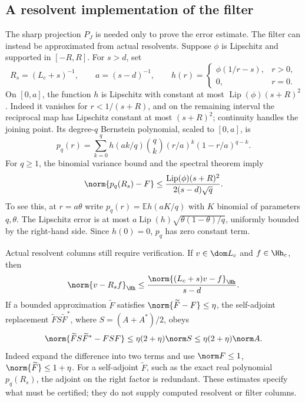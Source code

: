 \subsection{A resolvent implementation of the filter}
\label{vfourB:resolvent-filter}

The sharp projection $P_J$ is needed only to prove the error estimate.
The filter can instead be approximated from actual resolvents. Suppose
$\phi$ is Lipschitz and supported in $[-R,R]$. For $s>d$, set
\[
 R_s=(L_c+s)^{-1},\qquad a=(s-d)^{-1},\qquad
 h(r)=\begin{cases}\phi(1/r-s),&r>0,\\0,&r=0.\end{cases}
\]
On $[0,a]$, the function $h$ is Lipschitz with constant at most
$\operatorname{Lip}(\phi)(s+R)^2$. Indeed it vanishes for
$r<1/(s+R)$, and on the remaining interval the reciprocal map has
Lipschitz constant at most $(s+R)^2$; continuity handles the joining
point. Its degree-$q$ Bernstein polynomial, scaled to $[0,a]$, is
\[
 p_q(r)=\sum_{k=0}^q h(ak/q)\binom qk(r/a)^k(1-r/a)^{q-k}.
\]
For $q\ge1$, the binomial variance bound and the spectral theorem imply
\begin{equation}\label{vfourB:bernstein-error}
 \norm{p_q(R_s)-F}
 \le\frac{\operatorname{Lip}(\phi)(s+R)^2}
                 {2(s-d)\sqrt q}.
\end{equation}
To see this, at $r=a\theta$ write $p_q(r)=\mathbb E h(aK/q)$ with
$K$ binomial of parameters $q,\theta$. The Lipschitz error is at most
$a\operatorname{Lip}(h)\sqrt{\theta(1-\theta)/q}$, uniformly bounded
by the right-hand side. Since $h(0)=0$, $p_q$ has zero constant term.

Actual resolvent columns still require verification. If
$v\in\dom L_c$ and $f\in\Hh_c$, then
\begin{equation}\label{vfourB:resolvent-residual}
 \norm{v-R_sf}_{\Hh}
 \le\frac{\norm{(L_c+s)v-f}_{\Hh}}{s-d}.
\end{equation}
If a bounded approximation $\widetilde F$ satisfies
$\norm{\widetilde F-F}\le\eta$, the self-adjoint replacement
$\widetilde F S\widetilde F^*$, where $S=(A+A^*)/2$, obeys
\begin{equation}\label{vfourB:filter-replacement}
 \norm{\widetilde F S\widetilde F^*-FSF}
 \le\eta(2+\eta)\norm S
 \le\eta(2+\eta)\norm A.
\end{equation}
Indeed expand the difference into two terms and use
$\norm F\le1$, $\norm{\widetilde F}\le1+\eta$.
For a self-adjoint $\widetilde F$, such as the exact real polynomial
$p_q(R_s)$, the adjoint on the right factor is redundant. These estimates
specify what must be certified; they do not supply computed resolvent or
filter columns.

